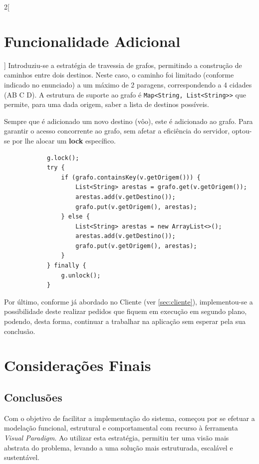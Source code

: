 \documentclass[a4paper,11pt]{article}
\begin{document}
\begin{multicols}{2}[\section{Funcionalidade Adicional}]
    Introduziu-se a estratégia de travessia de grafos, permitindo
    a construção de caminhos entre dois destinos.
    Neste caso, o caminho foi limitado (conforme indicado no enunciado)
    a um máximo de 2 paragens, correspondendo a 4 cidades (A\rightarrow B
    \rightarrow C \rightarrow D).
    A estrutura de suporte ao grafo é \texttt{Map<String, List<String>>}
    que permite, para uma dada origem, saber a lista de destinos possíveis.
    
    Sempre que é adicionado um novo destino (vôo), este é adicionado ao grafo.
    Para garantir o acesso concorrente ao grafo, sem afetar a eficiência do servidor,
    optou-se por lhe alocar um \textbf{lock} específico.
    \vspace{1cm}
    \begin{verbatim}
			g.lock();
			try {
				if (grafo.containsKey(v.getOrigem())) {
					List<String> arestas = grafo.get(v.getOrigem());
					arestas.add(v.getDestino());
					grafo.put(v.getOrigem(), arestas);
				} else {
					List<String> arestas = new ArrayList<>();
					arestas.add(v.getDestino());
					grafo.put(v.getOrigem(), arestas);
				}
			} finally {
				g.unlock();
			}
    \end{verbatim}

    Por último, conforme já abordado no Cliente (ver \ref{sec:cliente}), implementou-se
    a possibilidade deste realizar pedidos que fiquem em execução em segundo plano,
    podendo, desta forma, continuar a trabalhar na aplicação sem esperar pela
    sua conclusão.
\end{multicols}

\section{Considerações Finais}
\subsection{Conclusões}
Com o objetivo de facilitar a implementação do sistema, começou por se efetuar a modelação
funcional, estrutural e comportamental com recurso à ferramenta \textit{Visual Paradigm}.
Ao utilizar esta estratégia, permitiu ter uma visão mais abstrata do problema, levando
a uma solução mais estruturada, escalável e sustentável.
\end{document}
